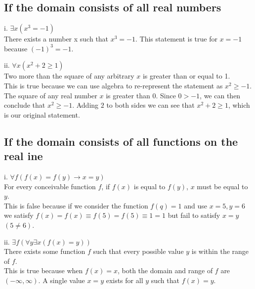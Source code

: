 \subsection{If the domain consists of all real numbers}
i. $\exists x(x^3 = -1)$ \\
There exists a number x such that $x^3=-1$. This statement is true for $x=-1$ because $(-1)^3=-1$.

ii. $\forall x(x^2+2 \geq 1)$ \\
Two more than the square of any arbitrary $x$ is greater than or equal to 1. \\
This is true because we can use algebra to re-represent the statement as $x^2 \geq -1$. The square of any real number $x$ is greater than 0. Since $0 > -1$, we can then conclude that $x^2 \geq -1$. Adding $2$ to both sides we can see that $x^2 + 2 \geq 1$, which is our original statement.

\subsection{If the domain consists of all functions on the real ine}
i. $\forall f(f(x) = f(y) \rightarrow x = y)$ \\
For every conceivable function $f$, if $f(x)$ is equal to $f(y)$, $x$ must be equal to $y$. \\
This is false because if we consider the function $f(q) = 1$ and use $x=5,y=6$ we satisfy $f(x) = f(x) \equiv f(5) = f(5) \equiv 1 = 1$ but fail to satisfy $x = y$ $(5 \neq 6)$.

ii. $\exists f(\forall y \exists x(f(x) = y))$ \\
There exists some function $f$ such that every possible value $y$ is within the range of $f$. \\
This is true because when $f(x) = x$, both the domain and range of $f$ are $(-\infty, \infty)$. A single value $x = y$ exists for all $y$ such that $f(x) = y.$

